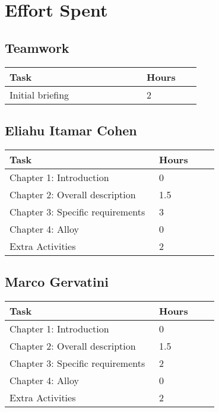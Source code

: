 \chapter{Effort Spent}

\section{Teamwork}
\begin{center}
    \begin{tabular}{@{}p{0.5\linewidth} p{0.2\linewidth}@{}}
        \hline
        \textbf{Task} & \textbf{Hours} \\ \hline
        Initial briefing & 2 \\ \hline
    \end{tabular}
\end{center}

\section{Eliahu Itamar Cohen}
\begin{center}
    \begin{tabular}{@{}p{0.5\linewidth} p{0.2\linewidth}@{}}
        \hline
        \textbf{Task} & \textbf{Hours} \\ \hline
        Chapter 1: Introduction & 0 \\ \hline
        Chapter 2: Overall description & 1.5 \\ \hline
        Chapter 3: Specific requirements & 3 \\ \hline
        Chapter 4: Alloy & 0 \\ \hline
        Extra Activities & 2 \\ \hline
    \end{tabular}
\end{center}

\section{Marco Gervatini}
\begin{center}
	\begin{tabular}{@{}p{0.5\linewidth} p{0.2\linewidth}@{}}
		\hline
		\textbf{Task} & \textbf{Hours} \\ \hline
            Chapter 1: Introduction & 0 \\ \hline
            Chapter 2: Overall description & 1.5 \\ \hline
            Chapter 3: Specific requirements & 2 \\ \hline
            Chapter 4: Alloy & 0 \\ \hline
            Extra Activities & 2 \\ \hline
	\end{tabular}
\end{center}

